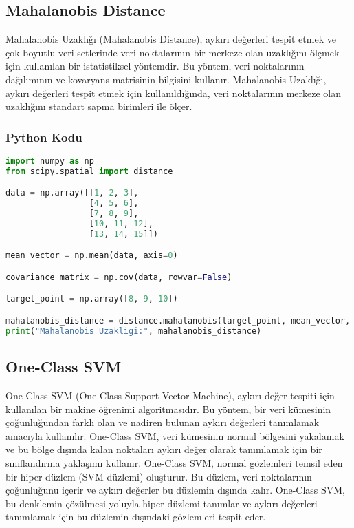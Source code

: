 \newpage

\subsection{Mahalanobis Distance}
Mahalanobis Uzaklığı (Mahalanobis Distance), aykırı değerleri tespit etmek ve çok boyutlu veri setlerinde veri noktalarının bir merkeze olan uzaklığını ölçmek için kullanılan bir istatistiksel yöntemdir. Bu yöntem, veri noktalarının dağılımının ve kovaryans matrisinin bilgisini kullanır. Mahalanobis Uzaklığı, aykırı değerleri tespit etmek için kullanıldığında, veri noktalarının merkeze olan uzaklığını standart sapma birimleri ile ölçer.

\subsubsection{Python Kodu}

\begin{lstlisting}[language=Python]
import numpy as np
from scipy.spatial import distance

data = np.array([[1, 2, 3],
                 [4, 5, 6],
                 [7, 8, 9],
                 [10, 11, 12],
                 [13, 14, 15]])

mean_vector = np.mean(data, axis=0)

covariance_matrix = np.cov(data, rowvar=False)

target_point = np.array([8, 9, 10])

mahalanobis_distance = distance.mahalanobis(target_point, mean_vector, np.linalg.inv(covariance_matrix))
print("Mahalanobis Uzakligi:", mahalanobis_distance)
\end{lstlisting}

\newpage

\subsection{One-Class SVM}
One-Class SVM (One-Class Support Vector Machine), aykırı değer tespiti için kullanılan bir makine öğrenimi algoritmasıdır. Bu yöntem, bir veri kümesinin çoğunluğundan farklı olan ve nadiren bulunan aykırı değerleri tanımlamak amacıyla kullanılır. One-Class SVM, veri kümesinin normal bölgesini yakalamak ve bu bölge dışında kalan noktaları aykırı değer olarak tanımlamak için bir sınıflandırma yaklaşımı kullanır. One-Class SVM, normal gözlemleri temsil eden bir hiper-düzlem (SVM düzlemi) oluşturur. Bu düzlem, veri noktalarının çoğunluğunu içerir ve aykırı değerler bu düzlemin dışında kalır. One-Class SVM, bu denklemin çözülmesi yoluyla hiper-düzlemi tanımlar ve aykırı değerleri tanımlamak için bu düzlemin dışındaki gözlemleri tespit eder.


